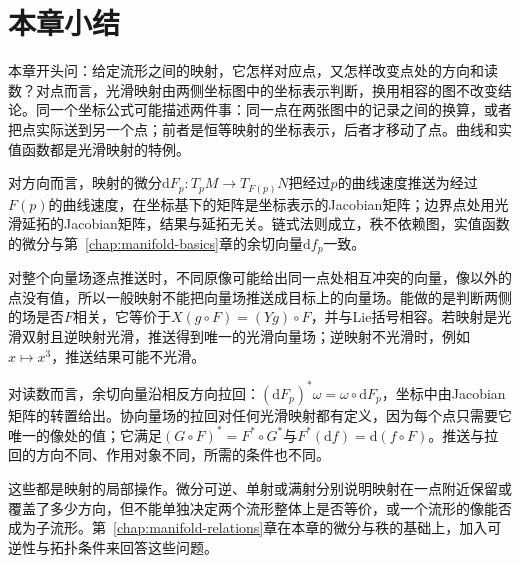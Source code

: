 \section{本章小结}
\label{sec:mmaps-summary}

本章开头问：给定流形之间的映射，它怎样对应点，又怎样改变点处的方向和读数？对点而言，光滑映射由两侧坐标图中的坐标表示判断，换用相容的图不改变结论。同一个坐标公式可能描述两件事：同一点在两张图中的记录之间的换算，或者把点实际送到另一个点；前者是恒等映射的坐标表示，后者才移动了点。曲线和实值函数都是光滑映射的特例。

对方向而言，映射的微分$\mathrm dF_p:T_pM\to T_{F(p)}N$把经过$p$的曲线速度推送为经过$F(p)$的曲线速度，在坐标基下的矩阵是坐标表示的Jacobian矩阵；边界点处用光滑延拓的Jacobian矩阵，结果与延拓无关。链式法则成立，秩不依赖图，实值函数的微分与第~\ref{chap:manifold-basics}章的余切向量$\mathrm df_p$一致。

对整个向量场逐点推送时，不同原像可能给出同一点处相互冲突的向量，像以外的点没有值，所以一般映射不能把向量场推送成目标上的向量场。能做的是判断两侧的场是否$F$相关，它等价于$X(g\circ F)=(Yg)\circ F$，并与Lie括号相容。若映射是光滑双射且逆映射光滑，推送得到唯一的光滑向量场；逆映射不光滑时，例如$x\mapsto x^3$，推送结果可能不光滑。

对读数而言，余切向量沿相反方向拉回：$(\mathrm dF_p)^*\omega=\omega\circ\mathrm dF_p$，坐标中由Jacobian矩阵的转置给出。协向量场的拉回对任何光滑映射都有定义，因为每个点只需要它唯一的像处的值；它满足$(G\circ F)^*=F^*\circ G^*$与$F^*(\mathrm df)=\mathrm d(f\circ F)$。推送与拉回的方向不同、作用对象不同，所需的条件也不同。

这些都是映射的局部操作。微分可逆、单射或满射分别说明映射在一点附近保留或覆盖了多少方向，但不能单独决定两个流形整体上是否等价，或一个流形的像能否成为子流形。第~\ref{chap:manifold-relations}章在本章的微分与秩的基础上，加入可逆性与拓扑条件来回答这些问题。
